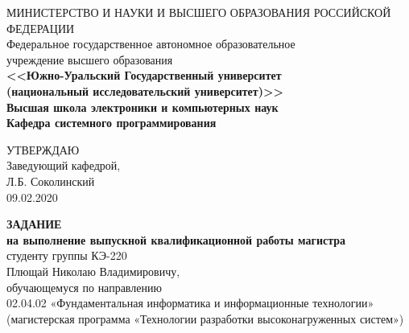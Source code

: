 \begin{titlepage}
    
    \begin{center}
        \footnotesize
        МИНИСТЕРСТВО И НАУКИ И ВЫСШЕГО ОБРАЗОВАНИЯ РОССИЙСКОЙ ФЕДЕРАЦИИ\\
        \small
        Федеральное государственное автономное образовательное\\
        учреждение высшего образования\\
        \normalsize
        \textbf{
        <<Южно-Уральский Государственный университет\\
        (национальный исследовательский университет)>>\\
        \small
        Высшая школа электроники и компьютерных наук\\
        Кафедра системного программирования
        \normalsize
        }
        \bigskip
    \end{center}

    \hfill
    \begin{minipage}{0.4\textwidth}
        УТВЕРЖДАЮ\\
        Заведующий кафедрой,\\
        \underline{\hspace{2cm}} Л.Б. Соколинский\\
        09.02.2020
    \end{minipage}

    \begin{center}
        \textbf{ЗАДАНИЕ}\\
        \textbf{на выполнение выпускной квалификационной работы магистра}\\
        студенту группы КЭ-220\\
        Плющай Николаю Владимировичу,\\
        обучающемуся по направлению\\
        02.04.02 «Фундаментальная информатика и информационные технологии»\\
        (магистерская программа «Технологии разработки высоконагруженных систем»)\\
    \end{center}


\end{titlepage}
